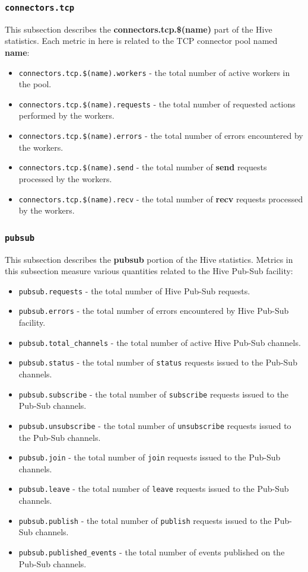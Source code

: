 \documentclass[a4paper]{article}
\begin{document}
\subsubsection{\texttt{connectors.tcp}}
\label{sec-4-2-14}

This subsection describes the \textbf{connectors.tcp.\$(name)} part of the Hive statistics. Each metric in here is related to the TCP connector pool named \textbf{name}:


\begin{itemize}
\item \texttt{connectors.tcp.\$(name).workers} - the total number of active workers in the pool.
\item \texttt{connectors.tcp.\$(name).requests} - the total number of requested actions performed by the workers.
\item \texttt{connectors.tcp.\$(name).errors} - the total number of errors encountered by the workers.
\item \texttt{connectors.tcp.\$(name).send} - the total number of \textbf{send} requests processed by the workers.
\item \texttt{connectors.tcp.\$(name).recv} - the total number of \textbf{recv} requests processed by the workers.
\end{itemize}
\subsubsection{\texttt{pubsub}}
\label{sec-4-2-15}

This subsection describes the \textbf{pubsub} portion of the Hive statistics. Metrics in this subsection measure various quantities related to the Hive Pub-Sub facility:


\begin{itemize}
\item \texttt{pubsub.requests} - the total number of Hive Pub-Sub requests.
\item \texttt{pubsub.errors} - the total number of errors encountered by Hive Pub-Sub facility.
\item \texttt{pubsub.total\_channels} - the total number of active Hive Pub-Sub channels.
\item \texttt{pubsub.status} - the total number of \texttt{status} requests issued to the Pub-Sub channels.
\item \texttt{pubsub.subscribe} - the total number of \texttt{subscribe} requests issued to the Pub-Sub channels.
\item \texttt{pubsub.unsubscribe} - the total number of \texttt{unsubscribe} requests issued to the Pub-Sub channels.
\item \texttt{pubsub.join} - the total number of \texttt{join} requests issued to the Pub-Sub channels.
\item \texttt{pubsub.leave} - the total number of \texttt{leave} requests issued to the Pub-Sub channels.
\item \texttt{pubsub.publish} - the total number of \texttt{publish} requests issued to the Pub-Sub channels.
\item \texttt{pubsub.published\_events} - the total number of events published on the Pub-Sub channels.
\end{itemize}
\end{document}
